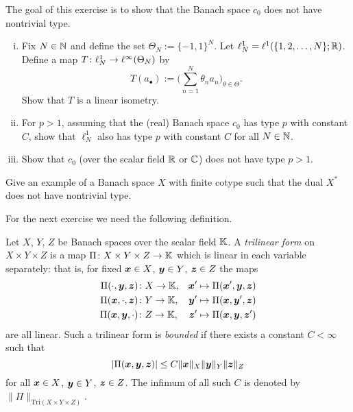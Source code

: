 \begin{exercise}\label{ex:c0-notype}
  The goal of this exercise is to show that the Banach space $c_{0}$ does not have nontrivial type.
  \begin{enumerate}[(i)]
  \item Fix $N \in \mathbb{N}$ and define the set $\Theta_{N} := \{-1,1\}^{N}$.
    Let $\ell^{1}_{N} = \ell^{1}(\{1,2,\ldots,N\};\mathbb{R})$.
    Define a map $T \colon \ell^{1}_{N} \rightarrow \ell^\infty(\Theta_{N})$ by
    \begin{equation*}
      T(a_{\bullet}) := \Big( \sum_{n=1}^{N} \theta_{n} a_{n}\Big)_{\theta \in \Theta}.
    \end{equation*}
    Show that $T$ is a linear isometry.

  \item For $p > 1$, assuming that the (real) Banach space $c_{0}$ has type $p$ with constant $C$, show that $\ell^{1}_{N}$ also has type $p$ with constant $C$ for all $N \in \mathbb{N}$.

  \item Show that $c_{0}$ (over the scalar field $\mathbb{R}$ or $\mathbb{C}$) does not have type $p > 1$.
  \end{enumerate}
\end{exercise}

\begin{exercise}
  Give an example of a Banach space $X$ with finite cotype such that the dual $X^{*}$ does not have nontrivial type.
\end{exercise}


For the next exercise we need the following definition.

\begin{defn}
  Let $X$, $Y$, $Z$ be Banach spaces over the scalar field $\mathbb{K}$.
  A \emph{trilinear form} on $X \times Y \times Z$ is a map $\Pi \colon X \times Y \times Z \rightarrow \mathbb{K}$ which is linear in each variable separately: that is, for fixed $\bm{x} \in X$, $\bm{y} \in Y$, $\bm{z} \in Z$ the maps
  \begin{equation*}
    \begin{aligned}
      \Pi(\cdot, \bm{y}, \bm{z}) &\colon X \to \mathbb{K}, &\bm{x}' \mapsto \Pi(\bm{x}',\bm{y},\bm{z}) \\
      \Pi(\bm{x}, \cdot, \bm{z}) &\colon Y \to \mathbb{K}, &\bm{y}' \mapsto \Pi(\bm{x},\bm{y}',\bm{z}) \\
      \Pi(\bm{x}, \bm{y}, \cdot) &\colon Z \to \mathbb{K}, &\bm{z}' \mapsto \Pi(\bm{x},\bm{y},\bm{z}')
  \end{aligned}
\end{equation*}
are all linear.
Such a trilinear form is \emph{bounded} if there exists a constant $C < \infty$ such that
\begin{equation*}
  |\Pi(\bm{x}, \bm{y}, \bm{z})| \leq C\|\bm{x}\|_{X} \|\bm{y}\|_{Y} \|\bm{z}\|_{Z}
\end{equation*}
for all $\bm{x} \in X$, $\bm{y} \in Y$, $\bm{z} \in Z$.
The infimum of all such $C$ is denoted by $\|\Pi\|_{\mathrm{Tri}(X \times Y \times Z)}$.
\end{defn}


